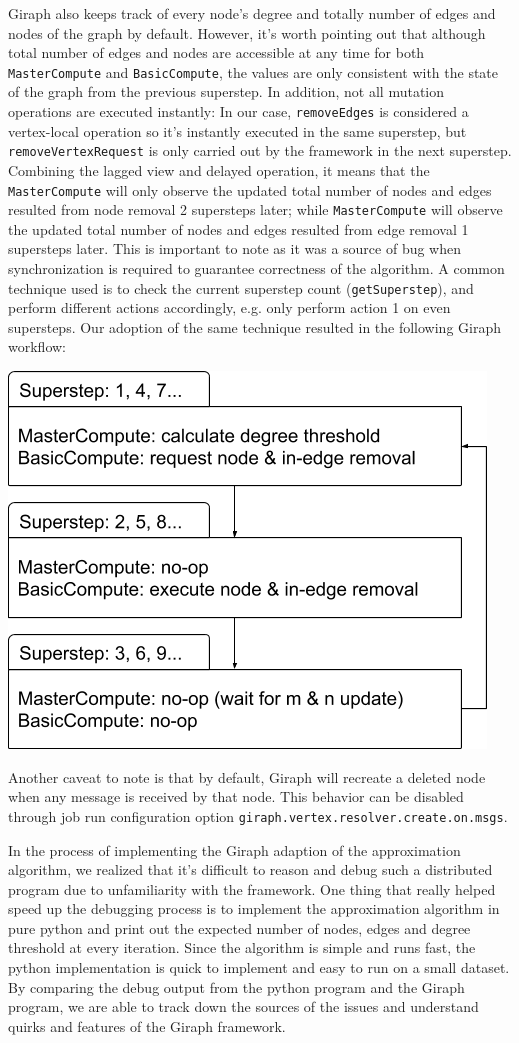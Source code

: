 \documentclass{article}
\begin{document}
Giraph also keeps track of every node's degree and totally number of edges and nodes of the graph by default. However, it's worth pointing out that although total number of edges and nodes are accessible at any time for both \texttt{MasterCompute} and \texttt{BasicCompute}, the values are only consistent with the state of the graph from the previous superstep. In addition, not all mutation operations are executed instantly: In our case, \texttt{removeEdges} is considered a vertex-local operation so it's instantly executed in the same superstep, but \texttt{removeVertexRequest} is only carried out by the framework in the next superstep. Combining the lagged view and delayed operation, it means that the \texttt{MasterCompute} will only observe the updated total number of nodes and edges resulted from node removal 2 supersteps later; while \texttt{MasterCompute} will observe the updated total number of nodes and edges resulted from edge removal 1 supersteps later. This is important to note as it was a source of bug when synchronization is required to guarantee correctness of the algorithm. A common technique used is to check the current superstep count (\texttt{getSuperstep}), and perform different actions accordingly, e.g. only perform action 1 on even supersteps. Our adoption of the same technique resulted in the following Giraph workflow:

\includegraphics[width=0.8\columnwidth]{giraph_job.png}

Another caveat to note is that by default, Giraph will recreate a deleted node when any message is received by that node. This behavior can be disabled through job run configuration option \texttt{giraph.vertex.resolver.create.on.msgs}.

In the process of implementing the Giraph adaption of the approximation algorithm, we realized that it's difficult to reason and debug such a distributed program due to unfamiliarity with the framework. One thing that really helped speed up the debugging process is to implement the approximation algorithm in pure python and print out the expected number of nodes, edges and degree threshold at every iteration. Since the algorithm is simple and runs fast, the python implementation is quick to implement and easy to run on a small dataset. By comparing the debug output from the python program and the Giraph program, we are able to track down the sources of the issues and understand quirks and features of the Giraph framework.
\end{document}

